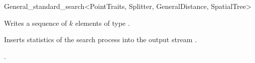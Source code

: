 \begin{ccRefClass}{General_standard_search<PointTraits, Splitter, GeneralDistance, SpatialTree>}
\ccOperations

{Writes a sequence of $k$ elements of type .} 

\begin{ccAdvanced}
{
Inserts statistics of the search process into the output stream .
}
\end{ccAdvanced}

\ccSeeAlso

.

\end{ccRefClass}


